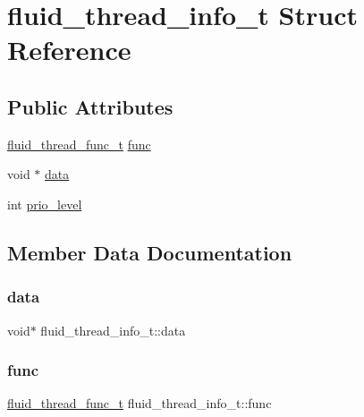 \hypertarget{structfluid__thread__info__t}{}\section{fluid\+\_\+thread\+\_\+info\+\_\+t Struct Reference}
\label{structfluid__thread__info__t}
\subsection*{Public Attributes}
\begin{DoxyCompactItemize}
\item 
\hyperlink{fluid__sys_8h_af283e5cd11572a767dd9b09e96b8e84a}{fluid\+\_\+thread\+\_\+func\+\_\+t} \hyperlink{structfluid__thread__info__t_abefd284445673cc29ca2020a6ef8cb91}{func}
\item 
void $\ast$ \hyperlink{structfluid__thread__info__t_a05b1dcc372a73177203b70c63637a7e4}{data}
\item 
int \hyperlink{structfluid__thread__info__t_a8347d1eb4166efef3f782b2b1fe15b76}{prio\+\_\+level}
\end{DoxyCompactItemize}


\subsection{Member Data Documentation}
\mbox{\label{structfluid__thread__info__t_a05b1dcc372a73177203b70c63637a7e4}} 
\subsubsection{\texorpdfstring{data}{data}}
{\footnotesize\ttfamily void$\ast$ fluid\+\_\+thread\+\_\+info\+\_\+t\+::data}

\mbox{\label{structfluid__thread__info__t_abefd284445673cc29ca2020a6ef8cb91}} 
\subsubsection{\texorpdfstring{func}{func}}
{\footnotesize\ttfamily \hyperlink{fluid__sys_8h_af283e5cd11572a767dd9b09e96b8e84a}{fluid\+\_\+thread\+\_\+func\+\_\+t} fluid\+\_\+thread\+\_\+info\+\_\+t\+::func}

